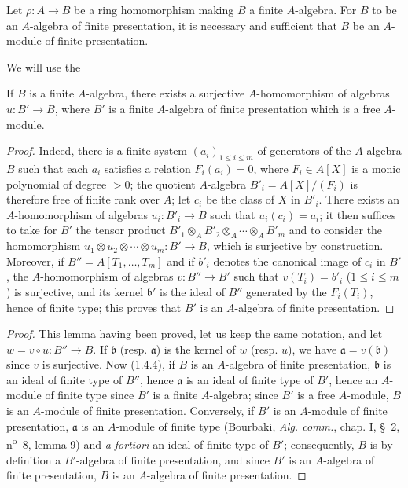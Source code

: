 \begin{proposition}[1.4.7]
\label{IV.1.4.7}
Let $\rho:A\to B$ be a ring homomorphism making $B$ a finite
$A$-algebra. For $B$ to be an $A$-algebra of finite presentation, it is
necessary and sufficient that $B$ be an $A$-module of finite presentation.
\end{proposition}

We will use the

\begin{lemma}[1.4.7.1]
\label{IV.1.4.7.1}
If $B$ is a finite $A$-algebra, there exists a surjective $A$-homomorphism
of algebras $u:B'\to B$, where $B'$ is a finite $A$-algebra of finite
presentation which is a free $A$-module.
\end{lemma}

\begin{proof}
Indeed, there is a finite system $(a_i)_{1\leq i\leq m}$ of generators of the
$A$-algebra $B$ such that each $a_i$ satisfies a relation $F_i(a_i)=0$, where
$F_i\in A[X]$ is a monic polynomial of degree $>0$; the quotient $A$-algebra
$B'_i=A[X]/(F_i)$ is therefore free of finite rank over $A$; let $c_i$ be the
class of $X$ in $B'_i$. There exists an $A$-homomorphism of algebras
$u_i:B'_i\to B$ such that $u_i(c_i)=a_i$; it then suffices to take for $B'$
the tensor product $B'_1\otimes_AB'_2\otimes_A\cdots\otimes_AB'_m$ and to
consider the homomorphism $u_1\otimes u_2\otimes\cdots\otimes u_m:B'\to B$,
which is surjective by construction. Moreover, if $B''=A[T_1,\ldots,T_m]$
and if $b'_i$ denotes the canonical image of $c_i$ in $B'$, the
$A$-homomorphism of algebras $v:B''\to B'$ such that $v(T_i)=b'_i$
($1\leq i\leq m$) is surjective, and its kernel $\mathfrak b'$ is the ideal
of $B''$ generated by the $F_i(T_i)$, hence of finite type; this proves that
$B'$ is an $A$-algebra of finite presentation.
\end{proof}

\begin{proof}
This lemma having been proved, let us keep the same notation, and let
$w=v\circ u:B''\to B$. If $\mathfrak b$ (resp. $\mathfrak a$) is the kernel of
$w$ (resp. $u$), we have $\mathfrak a=v(\mathfrak b)$ since $v$ is
surjective. Now (1.4.4), if $B$ is an $A$-algebra of finite presentation,
$\mathfrak b$ is an ideal of finite type of $B''$, hence $\mathfrak a$ is an
ideal of finite type of $B'$, hence an $A$-module of finite type since $B'$ is
a finite $A$-algebra; since $B'$ is a free $A$-module, $B$ is an $A$-module of
finite presentation. Conversely, if $B'$ is an $A$-module of finite
presentation, $\mathfrak a$ is an $A$-module of finite type (Bourbaki,
\emph{Alg. comm.}, chap. I, \S~2, n\textsuperscript{o}~8, lemma 9) and
\emph{a fortiori} an ideal of finite type of $B'$; consequently, $B$ is by
definition a $B'$-algebra of finite presentation, and since $B'$ is an
$A$-algebra of finite presentation, $B$ is an $A$-algebra of finite
presentation.
\end{proof}

